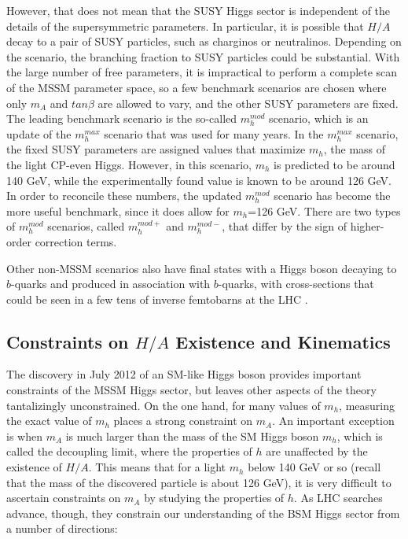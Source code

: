 However, that does not mean that the SUSY Higgs sector is 
independent of the details of the supersymmetric parameters.  In particular, 
it is possible that $H/A$ decay to a pair of 
SUSY particles, such as charginos or neutralinos.  Depending on the 
scenario, the branching fraction to SUSY particles could be substantial.  
With the large number of free parameters, it is impractical to 
perform a complete scan of the MSSM parameter space, so a 
few benchmark scenarios are chosen where only $m_A$ 
and $tan\beta$ are allowed to vary, and 
the other SUSY parameters are fixed.  The leading benchmark scenario is 
the so-called $m_h^{mod}$ scenario, 
which is an update of the $m_h^{max}$ 
scenario that was used for many years.  In the $m_h^{max}$ 
scenario, the fixed SUSY parameters are assigned values that maximize $m_h$, 
the mass of the light CP-even Higgs.  However, 
in this scenario, $m_h$ is predicted to 
be around 140 GeV, while the experimentally found value is known 
to be around 126 GeV.  In order to reconcile these numbers, 
the updated $m_h^{mod}$ scenario has become 
the more useful benchmark, since it does allow for $m_h$=126 GeV. 
There are two types of $m_h^{mod}$ scenarios, called $m_h^{mod+}$ and
$m_h^{mod-}$, that differ by the sign of higher-order correction terms. 



Other non-MSSM scenarios also have final states with a Higgs boson
decaying to $b$-quarks and produced in association with $b$-quarks,
with cross-sections that could be seen in a few tens of inverse 
femtobarns at the LHC \cite{Gori}.   









\subsection{Constraints on $H/A$ Existence and Kinematics}
The discovery in July 2012 of an SM-like Higgs boson provides important constraints of the MSSM Higgs sector,
 but leaves other aspects of the theory tantalizingly unconstrained.  On the one hand, 
for many values of $m_h$, measuring the exact value of $m_h$ 
places a strong constraint on $m_A$.
 An important exception is when 
$m_A$ is much larger than the mass of the SM Higgs 
boson $m_h$, which is called the decoupling limit, where the 
properties of $h$ are unaffected by the existence of $H/A$.
  This means that for a light $m_h$ below 140 GeV 
or so (recall that the mass of the discovered particle is about 126 GeV),
 it is very difficult to ascertain constraints on $m_A$ by studying the properties of $h$.  
 As LHC searches advance, though, they constrain our understanding of the BSM 
 Higgs sector from a number of directions: 

